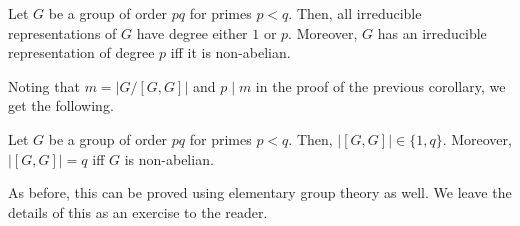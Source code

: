 	\begin{porism}
		Let $G$ be a group of order $pq$ for primes $p<q$. Then, all irreducible representations of $G$ have degree either $1$ or $p$. Moreover, $G$ has an irreducible representation of degree $p$ iff it is non-abelian. 
	\end{porism}

	Noting that $m = |G/[G,G]|$ and $p \mid m$ in the proof of the previous corollary, we get the following.

	\begin{fpor}
		Let $G$ be a group of order $pq$ for primes $p < q$. Then, $|[G,G]| \in \{1,q\}$. Moreover, $|[G,G]| = q$ iff $G$ is non-abelian.
	\end{fpor}

	As before, this can be proved using elementary group theory as well. We leave the details of this as an exercise to the reader.

